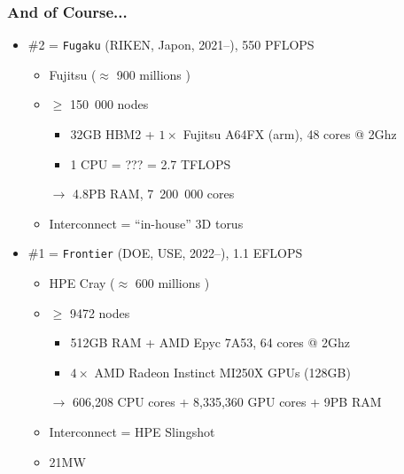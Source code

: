 \documentclass[xcolor={x11names,svgnames,psnames}]{beamer}
\newcommand{\euro}{\EUR\xspace}
\begin{document}
\begin{frame}
  \frametitle{And of Course...}

  \begin{itemize}
  \item \#2 = \texttt{Fugaku} (RIKEN, Japon, 2021--), 550 PFLOPS
    \begin{itemize}
    \item Fujitsu ($\approx$ 900 millions \euro)
    \item $\geq$ 150~000 nodes
      \begin{itemize}
      \item 32GB HBM2 + $1 \times$ Fujitsu A64FX (arm), 48 cores @ 2Ghz
      \item 1 CPU = ??? \euro = 2.7 TFLOPS
      \end{itemize}
    \item[$\rightarrow$] 4.8PB RAM, 7~200~000 cores
    \item Interconnect = ``in-house'' 3D torus
    \end{itemize}
  \end{itemize}

  \pause
  
  \begin{itemize}
  \item \#1 = \texttt{Frontier} (DOE, USE, 2022--), 1.1 EFLOPS
    \begin{itemize}
    \item HPE Cray ($\approx$ 600 millions \euro)
    \item $\geq$ 9472 nodes
      \begin{itemize}
      \item 512GB RAM + AMD Epyc 7A53, 64 cores @ 2Ghz
      \item $4 \times$ AMD Radeon Instinct MI250X GPUs (128GB) 
      \end{itemize}
    \item[$\rightarrow$] 606,208 CPU cores + 8,335,360 GPU cores + 9PB RAM
    \item Interconnect = HPE Slingshot
    \item 21MW
    \end{itemize}
  \end{itemize}


\end{frame}

\end{document}
